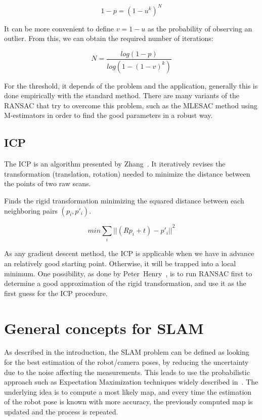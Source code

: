 \[
1-p = (1-u^k)^N
\]

It can be more convenient to define $v=1-u$ as the probability of observing an outlier. From this, we can obtain the required number of iterations:

\[
N = \frac{log(1-p)}{log(1-(1-v)^k)}
\]

For the threshold, it depends of the problem and the application, generally this is done empirically with the standard method. There are many variants of the \gls{RANSAC} that try to overcome this problem, such as the MLESAC method \cite{TorrZ00} using M-estimators in order to find the good parameters in a robust way.


\subsection{ICP}

The \gls{ICP} is an algorithm presented by Zhang~\cite{zhang_92_icp}.
It iteratively revises the transformation (translation, rotation) needed to minimize the distance between the points of two raw scans.

Finds the rigid transformation minimizing the squared distance between each neighboring pairs $(p_{i}, p'_{i})$.

\[min \sum_{i}{||(Rp_{i}+t)-p'_{i}||}^2\]


As any gradient descent method, the \gls{ICP} is applicable when we have in advance an relatively good starting point. Otherwise, it will be trapped into a local minimum. One possibility, as done by Peter~Henry~\cite{Intel_RGBD_2010}, is to run \gls{RANSAC} first to determine a good approximation of the rigid transformation, and use it as the first guess for the \gls{ICP} procedure.

\section{General concepts for SLAM}

As described in the introduction, the \gls{SLAM} problem can be defined as looking for the best estimation of the robot/camera poses, by reducing the uncertainty due to the noise affecting the measurements. This leads to use the probabilistic approach such as Expectation Maximization techniques widely described in~\cite{Thrun_2005}. The underlying idea is to compute a most likely map, and every time the estimation of the robot pose is known with more accuracy, the previously computed map is updated and the process is repeated.

